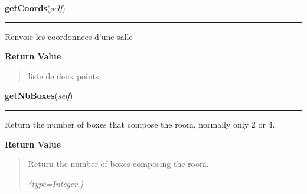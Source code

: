     \label{room:Room:getCoords}

    \vspace{0.5ex}

\hspace{.8\funcindent}\begin{boxedminipage}{\funcwidth}

    \raggedright \textbf{getCoords}(\textit{self})

    \vspace{-1.5ex}

    \rule{\textwidth}{0.5\fboxrule}
\setlength{\parskip}{2ex}
    Renvoie les coordonnees d'une salle

\setlength{\parskip}{1ex}
      \textbf{Return Value}
    \vspace{-1ex}

      \begin{quote}
      liste de deux points

      \end{quote}

    \end{boxedminipage}

    \label{room:Room:getNbBoxes}

    \vspace{0.5ex}

\hspace{.8\funcindent}\begin{boxedminipage}{\funcwidth}

    \raggedright \textbf{getNbBoxes}(\textit{self})

    \vspace{-1.5ex}

    \rule{\textwidth}{0.5\fboxrule}
\setlength{\parskip}{2ex}
    Return the number of boxes that compose the room, normally only 2 or 4.

\setlength{\parskip}{1ex}
      \textbf{Return Value}
    \vspace{-1ex}

      \begin{quote}
      Return the number of boxes composing the room.

      {\it (type=Integer.)}

      \end{quote}

    \end{boxedminipage}

